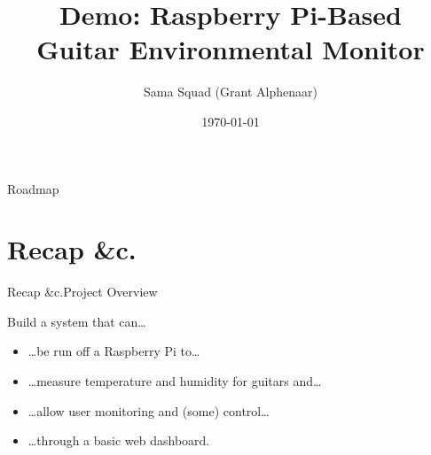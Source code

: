 \documentclass[aspectratio=169]{beamer}
\title{Demo: Raspberry Pi-Based\\Guitar Environmental Monitor}
\author{Sama Squad (Grant Alphenaar)}
\institute{CIS 641 -- GVSU}
\date{\today}
\begin{document}
  \newcommand{\sectitle}{}

  \begin{frame}
      \titlepage
  \end{frame}
  \begin{frame}{Roadmap}
    \tableofcontents
  \end{frame}

  \renewcommand{\sectitle}{Recap \&c.}
  \section{\sectitle}


    \begin{frame}{\sectitle}{Project Overview}

          Build a system that can\dots
          \begin{itemize}
            \item \dots be run off a Raspberry Pi to\dots
            \item \dots measure temperature and humidity for guitars and\dots
            \item \dots allow user monitoring and (some) control\dots
            \item \dots through a basic web dashboard.
          \end{itemize}

    \end{frame}



\end{document}
